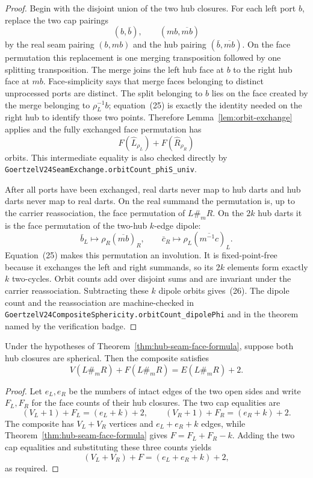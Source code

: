 \begin{proof}
Begin with the disjoint union of the two hub closures.  For each left port
\(b\), replace the two cap pairings
\[
  (b,\bar b),\qquad (m b,\overline{m b})
\]
by the real seam pairing \((b,m b)\) and the hub pairing
\((\bar b,\overline{m b})\).  On the face permutation this replacement is
one merging transposition followed by one splitting transposition.  The
merge joins the left hub face at \(b\) to the right hub face at \(m b\).
Face-simplicity says that merge faces belonging to distinct unprocessed
ports are distinct.  The split belonging to \(b\) lies on the face created
by the merge belonging to \(\rho_L^{-1}b\); equation~(25) is exactly the
identity needed on the right hub to identify those two points.  Therefore
Lemma~\ref{lem:orbit-exchange} applies and the fully exchanged face
permutation has
\[
 F(\widehat L_{\rho_L})+F(\widehat R_{\rho_R})
\]
orbits.  This intermediate equality is also checked directly by
\texttt{GoertzelV24SeamExchange.orbitCount\_phiS\_univ}.

After all ports have been exchanged, real darts never map to hub darts and
hub darts never map to real darts.  On the real summand the permutation is,
up to the carrier reassociation, the face permutation of \(L\#_mR\).  On
the \(2k\) hub darts it is the face permutation of the two-hub \(k\)-edge
dipole:
\[
 \bar b_L\longmapsto \rho_R(\overline{m b})_R,
 \qquad
 \bar c_R\longmapsto
       \rho_L(\overline{m^{-1}c})_L.
\]
Equation~(25) makes this permutation an involution.  It is fixed-point-free
because it exchanges the left and right summands, so its \(2k\) elements
form exactly \(k\) two-cycles.  Orbit counts add over disjoint sums and are
invariant under the carrier reassociation.  Subtracting these \(k\) dipole
orbits gives~(26).  The dipole count and the reassociation are machine-checked
in \texttt{GoertzelV24CompositeSphericity.orbitCount\_dipolePhi} and in the
theorem named by the verification badge.
\end{proof}

\begin{corollary}
\label{cor:hub-seam-sphericity}
Under the hypotheses of Theorem~\ref{thm:hub-seam-face-formula}, suppose
both hub closures are spherical.  Then the composite satisfies
\[
       V(L\#_mR)+F(L\#_mR)=E(L\#_mR)+2.
\]
\end{corollary}

\begin{proof}
Let \(e_L,e_R\) be the numbers of intact edges of the two open sides and
write \(F_L,F_R\) for the face counts of their hub closures.  The two cap
equalities are
\[
 (V_L+1)+F_L=(e_L+k)+2,
 \qquad
 (V_R+1)+F_R=(e_R+k)+2.
\]
The composite has \(V_L+V_R\) vertices and \(e_L+e_R+k\) edges, while
Theorem~\ref{thm:hub-seam-face-formula} gives
\(F=F_L+F_R-k\).  Adding the two cap equalities and substituting these three
counts yields
\[
 (V_L+V_R)+F=(e_L+e_R+k)+2,
\]
as required.
\end{proof}


